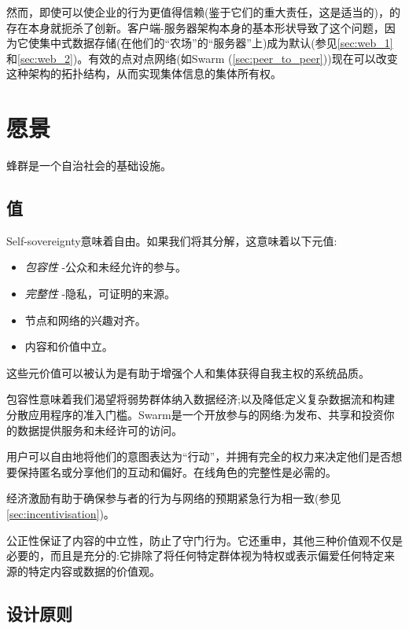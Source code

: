 然而，即使可以使企业的行为更值得信赖(鉴于它们的重大责任，这是适当的)，的存在本身就扼杀了创新。客户端-服务器架构本身的基本形状导致了这个问题，因为它使集中式数据存储(在他们的“农场”的“服务器”上)成为默认(参见\ref{sec:web_1}和\ref{sec:web_2})。有效的点对点网络(如Swarm (\ref{sec:peer_to_peer}))现在可以改变这种架构的拓扑结构，从而实现集体信息的集体所有权。 


\section{愿景\statusorange}\label{sec:vision}


\begin{displayquote}
蜂群是一个自治社会的基础设施。 
\end{displayquote}


\subsection{值\statusorange}\label{sec:values}

Self-sovereignty意味着自由。如果我们将其分解，这意味着以下元值:

\begin{itemize}
\item \emph{包容性} -公众和未经允许的参与。  
\item \emph{完整性} -隐私，可证明的来源。 
\item 节点和网络的兴趣对齐。
\item 内容和价值中立。  
\end{itemize}

这些元价值可以被认为是有助于增强个人和集体获得自我主权的系统品质。

包容性意味着我们渴望将弱势群体纳入数据经济;以及降低定义复杂数据流和构建分散应用程序的准入门槛。Swarm是一个开放参与的网络:为发布、共享和投资你的数据提供服务和未经许可的访问。

用户可以自由地将他们的意图表达为“行动”，并拥有完全的权力来决定他们是否想要保持匿名或分享他们的互动和偏好。在线角色的完整性是必需的。

经济激励有助于确保参与者的行为与网络的预期紧急行为相一致(参见\ref{sec:incentivisation})。

公正性保证了内容的中立性，防止了守门行为。它还重申，其他三种价值观不仅是必要的，而且是充分的:它排除了将任何特定群体视为特权或表示偏爱任何特定来源的特定内容或数据的价值观。 

\subsection{设计原则\statusorange}\label{sec:design-principles}
 

